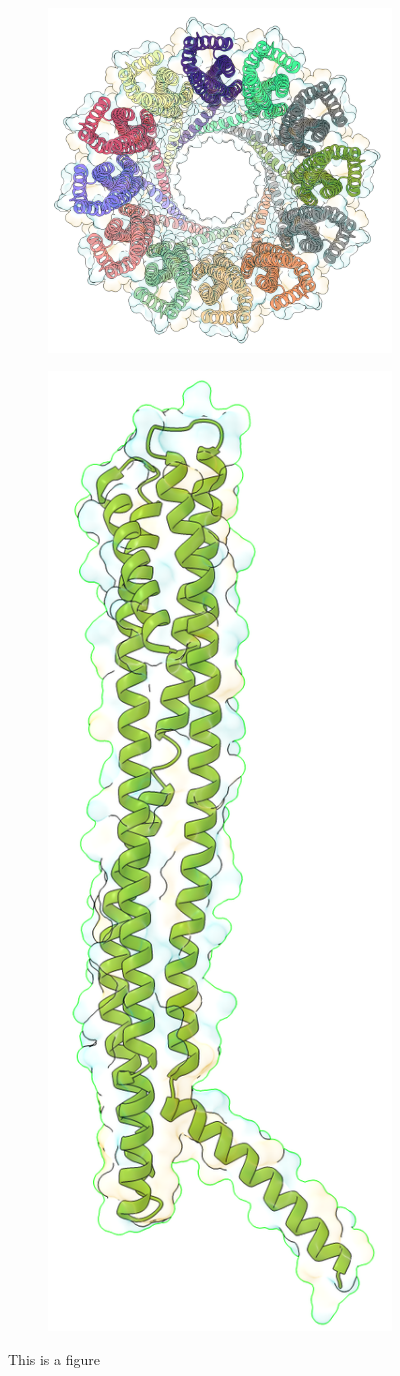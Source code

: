 \begin{figure}[ht]
\begin{centering}
  \begin{subfigure}[t]{\dimexpr.3\linewidth-1.3em\relax}
  \centering
  \includegraphics[width=\linewidth,valign=t]{Figures/clya-top-c.png}
  \end{subfigure}
  \begin{subfigure}[t]{\dimexpr.3\linewidth-1.3em\relax}
  \centering
  \includegraphics[width=.35\linewidth,valign=t]{Figures/clya-mon-c.png}
  \end{subfigure}

  \caption{This is a figure}
  \label{fig:test}
  \end{centering}
\end{figure}


